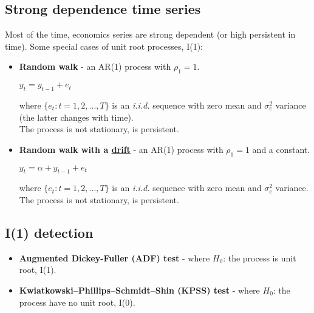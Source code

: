\documentclass[10pt, a4paper, landscape]{extarticle}
\begin{document}
\begin{multicols}{3}
\section*{Strong dependence time series}
	Most of the time, economics series are strong dependent (or high persistent in time). Some special cases of unit root processes, I(1):
	\begin{itemize}[leftmargin=*]
		\item \textbf{Random walk} - an AR(1) process with $\rho_1 = 1$.
		\begin{center}
			$y_t = y_{t-1} + e_t$
		\end{center}
		where $\lbrace e_t : t = 1, 2, ..., T \rbrace$ is an \textsl{i.i.d.} sequence with zero mean and $\sigma^2_e$ variance (the latter changes with time).
		\\ The process is not stationary, is persistent.
		\item \textbf{Random walk with a \href{https://www.youtube.com/watch?v=pS5d77DQHOI}{drift}} - an AR(1) process with $\rho_1 = 1$ and a constant.
		\begin{center}
			$y_t = \alpha + y_{t-1} + e_t$
		\end{center}
		where $\lbrace e_t : t = 1, 2, ..., T \rbrace$ is an \textsl{i.i.d.} sequence with zero mean and $\sigma^2_e$ variance.
		\\ The process is not stationary, is persistent.
	\end{itemize}
	\subsection*{I(1) detection}
		\begin{itemize}[leftmargin=*]
			\item \textbf{Augmented Dickey-Fuller (ADF) test} - where $H_0$: the process is unit root, I(1).
			\item \textbf{Kwiatkowski–Phillips–Schmidt–Shin (KPSS) test} - where $H_0$: the process have no unit root, I(0).
		\end{itemize}

\end{multicols}
\end{document}
